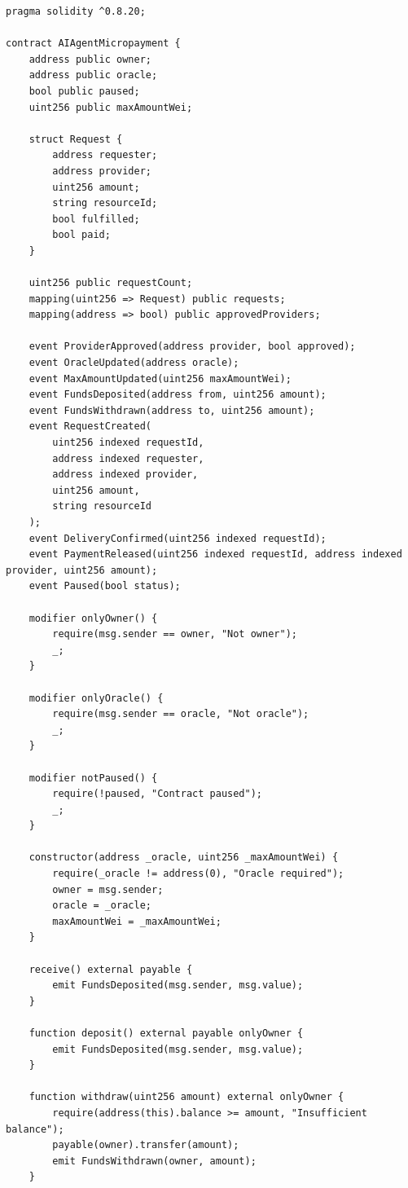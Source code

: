 \documentclass[12pt,a4paper,oneside]{article}
\theoremstyle{definition}
\theoremstyle{plain}
\begin{document}
\begin{lstlisting}[style=solidity,caption={Minimal Solidity prototype for AI-agent micropayments},label={lst:solidity}]
pragma solidity ^0.8.20;

contract AIAgentMicropayment {
    address public owner;
    address public oracle;
    bool public paused;
    uint256 public maxAmountWei;

    struct Request {
        address requester;
        address provider;
        uint256 amount;
        string resourceId;
        bool fulfilled;
        bool paid;
    }

    uint256 public requestCount;
    mapping(uint256 => Request) public requests;
    mapping(address => bool) public approvedProviders;

    event ProviderApproved(address provider, bool approved);
    event OracleUpdated(address oracle);
    event MaxAmountUpdated(uint256 maxAmountWei);
    event FundsDeposited(address from, uint256 amount);
    event FundsWithdrawn(address to, uint256 amount);
    event RequestCreated(
        uint256 indexed requestId,
        address indexed requester,
        address indexed provider,
        uint256 amount,
        string resourceId
    );
    event DeliveryConfirmed(uint256 indexed requestId);
    event PaymentReleased(uint256 indexed requestId, address indexed provider, uint256 amount);
    event Paused(bool status);

    modifier onlyOwner() {
        require(msg.sender == owner, "Not owner");
        _;
    }

    modifier onlyOracle() {
        require(msg.sender == oracle, "Not oracle");
        _;
    }

    modifier notPaused() {
        require(!paused, "Contract paused");
        _;
    }

    constructor(address _oracle, uint256 _maxAmountWei) {
        require(_oracle != address(0), "Oracle required");
        owner = msg.sender;
        oracle = _oracle;
        maxAmountWei = _maxAmountWei;
    }

    receive() external payable {
        emit FundsDeposited(msg.sender, msg.value);
    }

    function deposit() external payable onlyOwner {
        emit FundsDeposited(msg.sender, msg.value);
    }

    function withdraw(uint256 amount) external onlyOwner {
        require(address(this).balance >= amount, "Insufficient balance");
        payable(owner).transfer(amount);
        emit FundsWithdrawn(owner, amount);
    }


\end{lstlisting}
\end{document}
